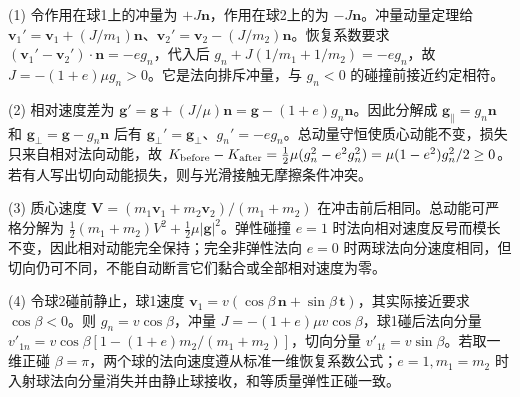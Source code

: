 (1) 令作用在球1上的冲量为 \(+J\mathbf n\)，作用在球2上的为 \(-J\mathbf n\)。冲量动量定理给 \(\mathbf v_1'=\mathbf v_1+(J/m_1)\mathbf n\)、\(\mathbf v_2'=\mathbf v_2-(J/m_2)\mathbf n\)。恢复系数要求 \((\mathbf v_1'-\mathbf v_2')\cdot\mathbf n=-e g_n\)，代入后 \(g_n+J(1/m_1+1/m_2)=-e g_n\)，故 \(J=-(1+e)\mu g_n>0\)。它是法向排斥冲量，与 \(g_n<0\) 的碰撞前接近约定相符。

(2) 相对速度差为 \(\mathbf g'=\mathbf g+(J/\mu)\mathbf n=\mathbf g-(1+e)g_n\mathbf n\)。因此分解成 \(\mathbf g_\parallel=g_n\mathbf n\) 和 \(\mathbf g_\perp=\mathbf g-g_n\mathbf n\) 后有 \(\mathbf g_\perp'=\mathbf g_\perp\)、\(g_n'=-eg_n\)。总动量守恒使质心动能不变，损失只来自相对法向动能，故 \(K_{\rm before}-K_{\rm after}=\frac12\mu(g_n^2-e^2g_n^2)=\mu(1-e^2)g_n^2/2\ge0\)。若有人写出切向动能损失，则与光滑接触无摩擦条件冲突。

(3) 质心速度 \(\mathbf V=(m_1\mathbf v_1+m_2\mathbf v_2)/(m_1+m_2)\) 在冲击前后相同。总动能可严格分解为 \(\frac12(m_1+m_2)V^2+\frac12\mu|\mathbf g|^2\)。弹性碰撞 \(e=1\) 时法向相对速度反号而模长不变，因此相对动能完全保持；完全非弹性法向 \(e=0\) 时两球法向分速度相同，但切向仍可不同，不能自动断言它们黏合或全部相对速度为零。

(4) 令球2碰前静止，球1速度 \(\mathbf v_1=v(\cos\beta\,\mathbf n+\sin\beta\,\mathbf t)\)，其实际接近要求 \(\cos\beta<0\)。则 \(g_n=v\cos\beta\)，冲量 \(J=-(1+e)\mu v\cos\beta\)，球1碰后法向分量 \(v'_{1n}=v\cos\beta[1-(1+e)m_2/(m_1+m_2)]\)，切向分量 \(v'_{1t}=v\sin\beta\)。若取一维正碰 \(\beta=\pi\)，两个球的法向速度遵从标准一维恢复系数公式；\(e=1,m_1=m_2\) 时入射球法向分量消失并由静止球接收，和等质量弹性正碰一致。
